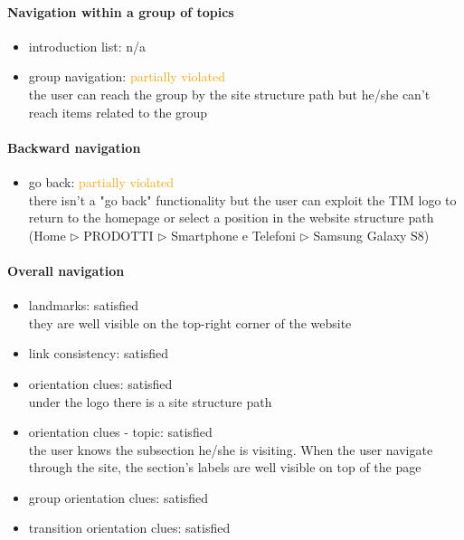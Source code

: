 \begin{enumerate}
	\paragraph*{Navigation within a group of topics}
	\begin{itemize}
		\item introduction list: n/a
		\item group navigation: \textcolor{orange}{partially violated}\\
		the user can reach the group by the site structure path but he/she can't reach items related to the group
	\end{itemize}

	\paragraph*{Backward navigation}
	\begin{itemize}
		\item go back: \textcolor{orange}{partially violated}\\
		there isn't a "go back" functionality but the user can exploit the TIM logo to return to the homepage or select a position in the website structure path (Home $\triangleright$ PRODOTTI $\triangleright$ Smartphone e Telefoni $\triangleright$ Samsung Galaxy S8)
	\end{itemize}

	\paragraph*{Overall navigation}
	\begin{itemize}
		\item landmarks: satisfied\\
		they are well visible on the top-right corner of the website
		\item link consistency: satisfied
		\item orientation clues: satisfied\\
		under the logo there is a site structure path
		\item orientation clues - topic: satisfied\\
		the user knows the subsection he/she is visiting. When the user navigate through the site, the section's labels are well visible on top of the page
		\item group orientation clues: satisfied
		\item transition orientation clues: satisfied
	\end{itemize}	


\end{enumerate}
